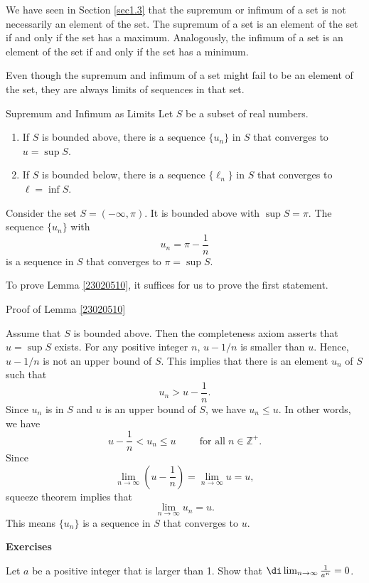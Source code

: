 We have seen in Section \ref{sec1.3} that the supremum or infimum of a set is not necessarily an element of the set. The supremum of a set is an element of the set if and only if the set has a maximum. Analogously,  the infimum of a set is an element of the set if and only if the set has a minimum.

Even though the supremum and infimum of a set might fail to be an element of the set,  they are always limits of sequences in that set.
\begin{lemma}[label=23020510]{Supremum and Infimum as Limits}
Let $S$ be a subset of real numbers.
\begin{enumerate}[1.]
\item
If $S$ is bounded above, there is a sequence $\{u_n\}$ in $S$ that converges to $u=\sup S$.
\item If $S$ is bounded below, there is a sequence $\{\ell_n\}$ in $S$ that converges to $\ell=\inf S$.
\end{enumerate}
\end{lemma}



\begin{example}[label=23020601]{}
Consider the set $S=(-\infty, \pi)$. It is bounded above with $\sup S=\pi$. The sequence $\{u_n\}$ with 
\[u_n=\pi -\frac{1}{n}\] is a sequence in $S$ that converges to $\pi=\sup S$.
\end{example}

To prove Lemma \ref{23020510}, it suffices for us to prove the first statement.

 
\begin{myproof}{\linkt Proof of Lemma \ref{23020510}\linko}
 
 Assume that $S$ is bounded above. Then the completeness axiom asserts that $u=\sup S$ exists. For any positive integer $n$, $u-1/n$ is smaller than $u$. Hence, $u-1/n$ is not an upper bound of $S$.   This implies that there is an element $u_n$ of $S$ such that
\[u_n>u-\frac{1}{n}.\]
Since $u_n$ is in $S$ and $u$ is an upper bound of $S$, we have $u_n\leq u$. In other words, we have
\[u-\frac{1}{n}<u_n\leq u\hspace{1cm}\text{for all}\;n\in\mathbb{Z}^+.\]
Since
\[\lim_{n\rightarrow \infty}\left(u-\frac{1}{n}\right)=\lim_{n\rightarrow \infty} u=u,\]
  squeeze theorem implies that
\[\lim_{n\rightarrow \infty}u_n=u.\]This means $\{u_n\}$ is  a sequence in $S$ that converges to $u$.
\end{myproof}


\vp
\noindent
{\bf \large Exercises  \thesection}
\setcounter{myquestion}{1}
 \begin{question}{\themyquestion}
Let $a$ be a positive integer that is larger than 1. Show that
$\di \lim_{n\rightarrow\infty}\frac{1}{a^n}=0$.
\end{question}

